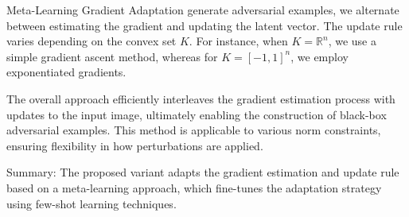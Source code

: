 Meta-Learning Gradient Adaptation generate adversarial examples, we alternate between estimating the gradient and updating the latent vector. The update rule varies depending on the convex set $K$. For instance, when $K = \mathbb{R}^n$, we use a simple gradient ascent method, whereas for $K = [-1, 1]^n$, we employ exponentiated gradients. 

The overall approach efficiently interleaves the gradient estimation process with updates to the input image, ultimately enabling the construction of black-box adversarial examples. This method is applicable to various norm constraints, ensuring flexibility in how perturbations are applied.

Summary: The proposed variant adapts the gradient estimation and update rule based on a meta-learning approach, which fine-tunes the adaptation strategy using few-shot learning techniques.